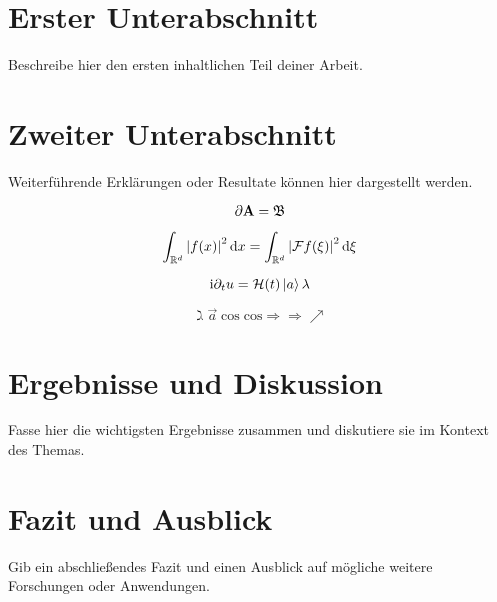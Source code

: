 \section{Erster Unterabschnitt}
Beschreibe hier den ersten inhaltlichen Teil deiner Arbeit.

\section{Zweiter Unterabschnitt}
Weiterführende Erklärungen oder Resultate können hier dargestellt werden.

\begin{equation*}
    \partial \mathbf{A} = \mathfrak{B}
\end{equation*}

\medskip

\begin{equation}
    \int_{\mathbb{R}^d} {\left\vert f(x)\right\vert}^2 \, \mathrm{d} x = \int_{\mathbb{R}^d} {\left\vert\mathcal{F} f(\xi)\right\vert}^2 \, \mathrm{d} \xi
\end{equation}

\medskip

\begin{equation}
    \mathrm{i} \partial_t u = \mathcal{H}(t) \Ket{a} \lambda 
\end{equation}

\begin{equation}
    \gimel \overrightarrow{a} \cos \mathrm{cos} \Rightarrow \Longrightarrow \nearrow 
\end{equation}

\section{Ergebnisse und Diskussion}
Fasse hier die wichtigsten Ergebnisse zusammen und diskutiere sie im Kontext des Themas.
\cite{Park:18}

\section{Fazit und Ausblick}
Gib ein abschließendes Fazit und einen Ausblick auf mögliche weitere Forschungen oder Anwendungen.
